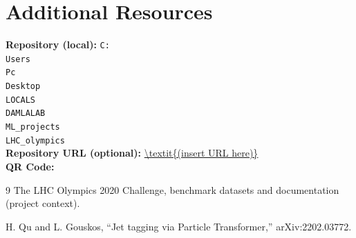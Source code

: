 \documentclass[journal]{IEEEtran}
\begin{document}
\section{Additional Resources}
\noindent\textbf{Repository (local):} \texttt{C:\\Users\\Pc\\Desktop\\LOCALS\\DAMLALAB\\ML\_projects\\LHC\_olympics}\\
\noindent\textbf{Repository URL (optional):} \url{\textit{(insert URL here)}}\\
\vspace{4pt}
\noindent\textbf{QR Code:}\\

\begin{thebibliography}{9}
The LHC Olympics 2020 Challenge, benchmark datasets and documentation (project context).

H. Qu and L. Gouskos, ``Jet tagging via Particle Transformer,'' arXiv:2202.03772.
\end{thebibliography}
\end{document}
